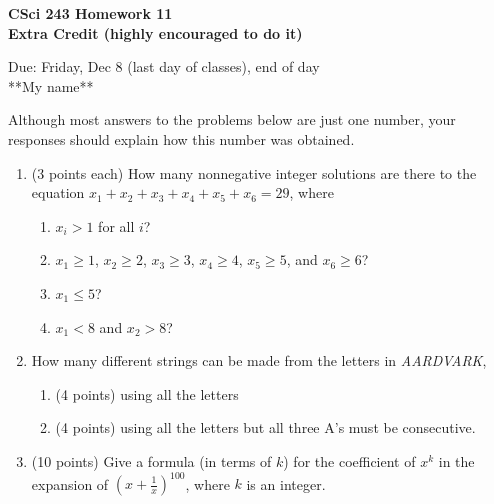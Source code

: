 \documentclass[11pt]{article}
\begin{document}
\begin{center}             %
\begin{LARGE}
{\bf CSci 243 Homework 11 \\ 
	Extra Credit (highly encouraged to do it)}
\end{LARGE}
\vskip 0.25cm      %

Due: Friday, Dec 8 (last day of classes), end of day  \\  %

**My name**
\end{center}
Although most answers to the problems below are just one number, 
 your responses should explain how this number was obtained.

\begin{enumerate}

\item (3 points each) 
How many nonnegative integer solutions are there to the equation 
$x_1+x_2+x_3+x_4+x_5+x_6=29$, where
\begin{enumerate}
\item $x_i>1$ for all $i$? 
\item $x_1\ge1$, $x_2\ge2$, $x_3\ge3$, $x_4\ge4$, $x_5\ge5$, and $x_6\ge6$? 
\item $x_1\le 5$?
\item $x_1<8$ and $x_2>8$? 
\end{enumerate}

\item
How many different strings can be made from the letters in {\it AARDVARK},
\begin{enumerate}
\item (4 points) using all the letters
\item (4 points) using all the letters but all three A's must be consecutive.
\end{enumerate}

\item (10 points) Give a formula (in terms of $k$) for the coefficient of
$x^k$ in the expansion of $(x+\frac{1}{x})^{100}$, where $k$ is an integer.

\end{enumerate}
\end{document}
